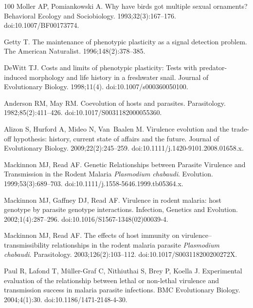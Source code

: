\documentclass[10pt,letterpaper]{article}
\begin{document}
\begin{thebibliography}{100}
Moller AP, Pomiankowski A.
\newblock Why have birds got multiple sexual ornaments?
\newblock Behavioral Ecology and Sociobiology. 1993;32(3):167--176.
\newblock doi:{10.1007/BF00173774}.

Getty T.
\newblock The maintenance of phenotypic plasticity as a signal detection problem.
\newblock The American Naturalist. 1996;148(2):378--385.

DeWitt TJ.
\newblock Costs and limits of phenotypic plasticity: {Tests} with predator-induced morphology and life history in a freshwater snail.
\newblock Journal of Evolutionary Biology. 1998;11(4).
\newblock doi:{10.1007/s000360050100}.

Anderson RM, May RM.
\newblock Coevolution of hosts and parasites.
\newblock Parasitology. 1982;85(2):411--426.
\newblock doi:{10.1017/S0031182000055360}.

Alizon S, Hurford A, Mideo N, Van~Baalen M.
\newblock Virulence evolution and the trade-off hypothesis: history, current state of affairs and the future.
\newblock Journal of Evolutionary Biology. 2009;22(2):245--259.
\newblock doi:{10.1111/j.1420-9101.2008.01658.x}.

Mackinnon MJ, Read AF.
\newblock Genetic {Relationships} between {Parasite} {Virulence} and {Transmission} in the {Rodent} {Malaria} \textit{{Plasmodium} chabaudi}.
\newblock Evolution. 1999;53(3):689--703.
\newblock doi:{10.1111/j.1558-5646.1999.tb05364.x}.

Mackinnon MJ, Gaffney DJ, Read AF.
\newblock Virulence in rodent malaria: host genotype by parasite genotype interactions.
\newblock Infection, Genetics and Evolution. 2002;1(4):287--296.
\newblock doi:{10.1016/S1567-1348(02)00039-4}.

Mackinnon MJ, Read AF.
\newblock The effects of host immunity on virulence–transmissibility relationships in the rodent malaria parasite \textit{{Plasmodium} chabaudi}.
\newblock Parasitology. 2003;126(2):103--112.
\newblock doi:{10.1017/S003118200200272X}.

Paul R, Lafond T, Müller-Graf C, Nithiuthai S, Brey P, Koella J.
\newblock Experimental evaluation of the relationship between lethal or non-lethal virulence and transmission success in malaria parasite infections.
\newblock BMC Evolutionary Biology. 2004;4(1):30.
\newblock doi:{10.1186/1471-2148-4-30}.


\end{thebibliography}
\end{document}
